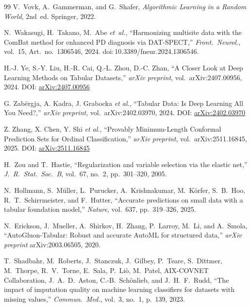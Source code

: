 \begin{thebibliography}{99}
V.~Vovk, A.~Gammerman, and G.~Shafer, \textit{Algorithmic Learning in a Random World}, 2nd~ed. Springer, 2022.

N.~Wakasugi, H.~Takano, M.~Abe \textit{et~al.}, ``Harmonizing multisite data with the ComBat method for enhanced PD diagnosis via DAT-SPECT,'' \textit{Front.\ Neurol.}, vol.~15, Art.\ no.~1306546, 2024. doi:\,10.3389/fneur.2024.1306546.

H.-J. Ye, S.-Y. Liu, H.-R. Cai, Q.-L. Zhou, D.-C. Zhan,
``A Closer Look at Deep Learning Methods on Tabular Datasets,''
\textit{arXiv preprint}, vol.~arXiv:2407.00956, 2024. DOI: \href{https://arxiv.org/abs/2407.00956}{arXiv:2407.00956}

G. Zabërgja, A. Kadra, J. Grabocka \textit{et al.},
``Tabular Data: Is Deep Learning All You Need?,''
\textit{arXiv preprint}, vol.~arXiv:2402.03970, 2024. DOI: \href{https://arxiv.org/abs/2402.03970}{arXiv:2402.03970}

Z. Zhang, X. Chen, Y. Shi \textit{et al.},
``Provably Minimum-Length Conformal Prediction Sets for Ordinal Classification,''
\textit{arXiv preprint}, vol.~arXiv:2511.16845, 2025. DOI: \href{https://arxiv.org/abs/2511.16845}{arXiv:2511.16845}

H.~Zou and T.~Hastie, ``Regularization and variable selection via the elastic net,'' \textit{J.\ R.\ Stat.\ Soc.\ B}, vol.~67, no.~2, pp.~301--320, 2005.

N.~Hollmann, S.~M\"uller, L.~Purucker, A.~Krishnakumar, M.~K\"orfer, S.~B.~Hoo, R.~T.~Schirrmeister, and F.~Hutter, ``Accurate predictions on small data with a tabular foundation model,'' \textit{Nature}, vol.~637, pp.~319--326, 2025.

N.~Erickson, J.~Mueller, A.~Shirkov, H.~Zhang, P.~Larroy, M.~Li, and A.~Smola, ``AutoGluon-Tabular: Robust and accurate AutoML for structured data,'' \textit{arXiv preprint} arXiv:2003.06505, 2020.

T.~Shadbahr, M.~Roberts, J.~Stanczuk, J.~Gilbey, P.~Teare, S.~Dittmer, M.~Thorpe, R.~V.~Torne, E.~Sala, P.~Li\`o, M.~Patel, AIX-COVNET Collaboration, J.~A.~D.~Aston, C.-B.~Sch\"onlieb, and J.~H.~F.~Rudd, ``The impact of imputation quality on machine learning classifiers for datasets with missing values,'' \textit{Commun.\ Med.}, vol.~3, no.~1, p.~139, 2023.


\end{thebibliography}
